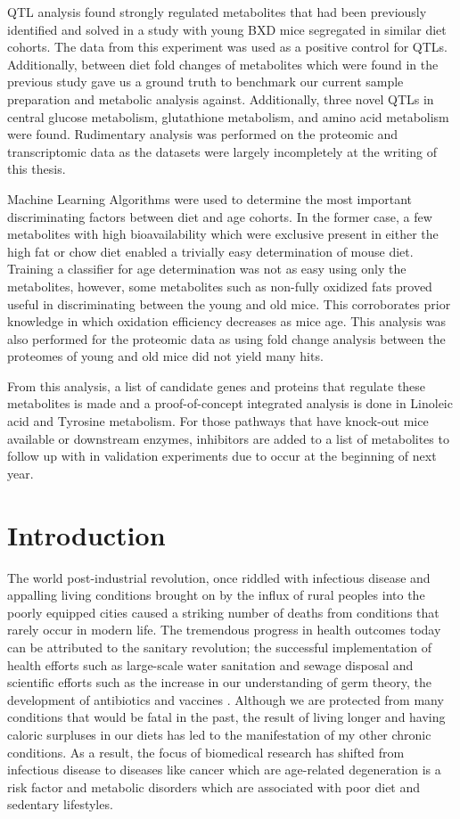 \documentclass[a4paper,11pt,twoside]{book}
\begin{document}
QTL analysis found strongly regulated metabolites that had been previously identified and solved in a study with young BXD mice segregated in similar diet cohorts. The data from this experiment was used as a positive control for QTLs. Additionally, between diet fold changes of metabolites which were found in the previous study gave us a ground truth to benchmark our current sample preparation and metabolic analysis against. Additionally, three novel QTLs in central glucose metabolism, glutathione metabolism, and amino acid metabolism were found. Rudimentary analysis was performed on the proteomic and transcriptomic data as the datasets were largely incompletely at the writing of this thesis.

Machine Learning Algorithms were used to determine the most important discriminating factors between diet and age cohorts. In the former case, a few metabolites with high bioavailability which were exclusive present in either the high fat or chow diet enabled a trivially easy determination of mouse diet. Training a classifier for age determination was not as easy using only the metabolites, however, some metabolites such as non-fully oxidized fats proved useful in discriminating between the young and old mice. This corroborates prior knowledge in which oxidation efficiency decreases as mice age. This analysis was also performed for the proteomic data as using fold change analysis between the proteomes of young and old mice did not yield many hits.

From this analysis, a list of candidate genes and proteins that regulate these metabolites is made and a proof-of-concept integrated analysis is done in Linoleic acid and Tyrosine metabolism. For those pathways that have knock-out mice available or downstream enzymes, inhibitors are added to a list of metabolites to follow up with in validation experiments due to occur at the beginning of next year.
	
	\chapter{Introduction}
	
	The world post-industrial revolution, once riddled with infectious disease and appalling living conditions brought on by the influx of rural peoples into the poorly equipped cities caused a striking number of deaths from conditions that rarely occur in modern life\citep{JOEPINSKER2013}. The tremendous progress in health outcomes today can be attributed to the sanitary revolution; the successful implementation of health efforts such as large-scale water sanitation and sewage disposal and scientific efforts such as the increase in our understanding of germ theory, the development of antibiotics and vaccines \citep{Mackenbach2007}. Although we are protected from many conditions that would be fatal in the past, the result of living longer and having caloric surpluses in our diets has led to the manifestation of my other chronic conditions. As a result, the focus of biomedical research has shifted from infectious disease to diseases like cancer which are age-related degeneration is a risk factor and metabolic disorders which are associated with poor diet and sedentary lifestyles. 
	
\end{document}
